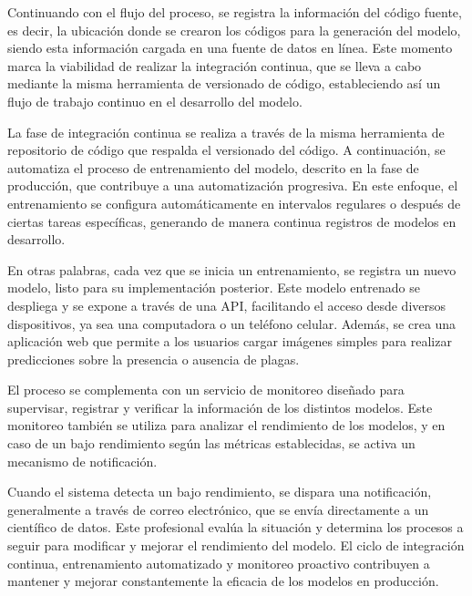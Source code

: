 \newpage

Continuando con el flujo del proceso, se registra la información del código fuente, es decir, la ubicación donde se crearon los códigos para la generación del modelo, siendo esta información cargada en una fuente de datos en línea. Este momento marca la viabilidad de realizar la integración continua, que se lleva a cabo mediante la misma herramienta de versionado de código, estableciendo así un flujo de trabajo continuo en el desarrollo del modelo. \newline

La fase de integración continua se realiza a través de la misma herramienta de repositorio de código que respalda el versionado del código. A continuación, se automatiza el proceso de entrenamiento del modelo, descrito en la fase de producción, que contribuye a una automatización progresiva. En este enfoque, el entrenamiento se configura automáticamente en intervalos regulares o después de ciertas tareas específicas, generando de manera continua registros de modelos en desarrollo. \newline

En otras palabras, cada vez que se inicia un entrenamiento, se registra un nuevo modelo, listo para su implementación posterior. Este modelo entrenado se despliega y se expone a través de una API, facilitando el acceso desde diversos dispositivos, ya sea una computadora o un teléfono celular. Además, se crea una aplicación web que permite a los usuarios cargar imágenes simples para realizar predicciones sobre la presencia o ausencia de plagas. \newline

El proceso se complementa con un servicio de monitoreo diseñado para supervisar, registrar y verificar la información de los distintos modelos. Este monitoreo también se utiliza para analizar el rendimiento de los modelos, y en caso de un bajo rendimiento según las métricas establecidas, se activa un mecanismo de notificación. \newline

Cuando el sistema detecta un bajo rendimiento, se dispara una notificación, generalmente a través de correo electrónico, que se envía directamente a un científico de datos. Este profesional evalúa la situación y determina los procesos a seguir para modificar y mejorar el rendimiento del modelo. El ciclo de integración continua, entrenamiento automatizado y monitoreo proactivo contribuyen a mantener y mejorar constantemente la eficacia de los modelos en producción. \newline


